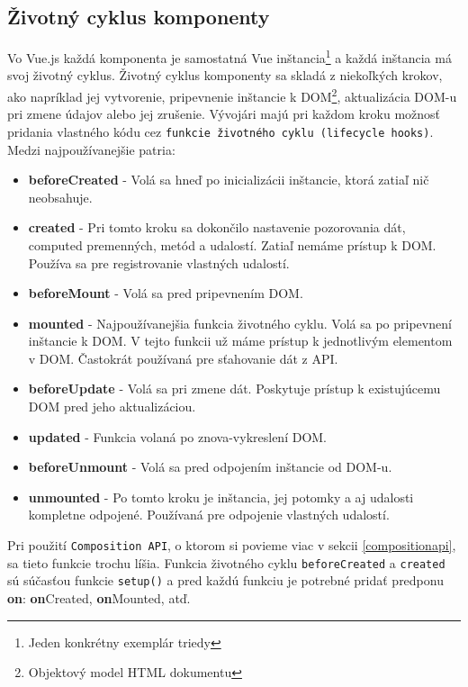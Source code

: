\subsection*{Životný cyklus komponenty}
Vo Vue.js každá komponenta je samostatná Vue inštancia\footnote{Jeden konkrétny exemplár triedy} a každá inštancia má svoj životný cyklus. Životný cyklus komponenty sa skladá z niekoľkých krokov, ako napríklad jej vytvorenie, pripevnenie inštancie k DOM\footnote{Objektový model HTML dokumentu}, aktualizácia DOM-u pri zmene údajov alebo jej zrušenie. Vývojári majú pri každom kroku možnosť pridania vlastného kódu cez \texttt{funkcie životného cyklu (lifecycle hooks)}. Medzi najpoužívanejšie patria:
    \begin{itemize}
        \item\textbf{beforeCreated} - Volá sa hneď po inicializácii inštancie, ktorá zatiaľ nič neobsahuje.
        \item\textbf{created} - Pri tomto kroku sa dokončilo nastavenie pozorovania dát, computed premenných, metód a udalostí. Zatiaľ nemáme prístup k DOM. Používa sa pre registrovanie vlastných udalostí.
        \item\textbf{beforeMount} - Volá sa pred pripevnením DOM.
        \item\textbf{mounted} - Najpoužívanejšia funkcia životného cyklu. Volá sa po pripevnení inštancie k DOM. V tejto funkcii už máme prístup k jednotlivým elementom v DOM. Častokrát používaná pre sťahovanie dát z API.
        \item\textbf{beforeUpdate} - Volá sa pri zmene dát. Poskytuje prístup k existujúcemu DOM pred jeho aktualizáciou.
        \item\textbf{updated} - Funkcia volaná po znova-vykreslení DOM.
        \item\textbf{beforeUnmount} - Volá sa pred odpojením inštancie od DOM-u.
        \item\textbf{unmounted} - Po tomto kroku je inštancia, jej potomky a aj udalosti kompletne odpojené. Používaná pre odpojenie vlastných udalostí.
    \end{itemize}

Pri použití \texttt{Composition API}, o ktorom si povieme viac v sekcii \ref{compositionapi}, sa tieto funkcie trochu líšia. Funkcia životného cyklu \texttt{beforeCreated} a \texttt{created} sú súčasťou funkcie \texttt{setup()} a pred každú funkciu je potrebné pridať predponu \textbf{on}: \textbf{on}Created, \textbf{on}Mounted, atď. 

